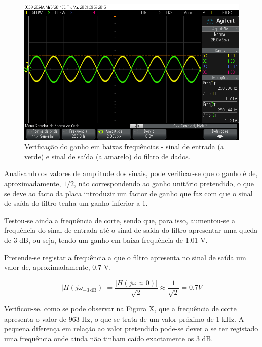 \documentclass[11pt]{article}
\numberwithin{equation}{section}
\begin{document}
\begin{figure}[H]
	\centering
	\includegraphics[keepaspectratio=true, scale=0.37]{exps/filtro_1k_baixafreq}
	\caption{Verificação do ganho em baixas frequências - sinal de entrada (a verde) e sinal de saída (a amarelo) do filtro de dados.}
	\vspace{-0.8em}
\end{figure} 

Analisando os valores de amplitude dos sinais, pode verificar-se que o ganho é de, aproximadamente, $1/2$, não correspondendo ao ganho unitário pretendido, o que se deve ao facto da placa introduzir um factor de ganho que faz com que o sinal de saída do filtro tenha um ganho inferior a 1. 

Testou-se ainda a frequência de corte, sendo que, para isso, aumentou-se a frequência do sinal de entrada até o sinal de saída do filtro apresentar uma queda de 3 dB, ou seja, tendo um ganho em baixa frequência de 1.01 V. 

Pretende-se registar a frequência a que o filtro apresenta no sinal de saída um valor de, aproximadamente, 0.7 V.

\vspace{-3mm}
\begin{equation}
	|H(j\omega_{-3~\text{dB}})| = \frac{|H(j\omega \approx 0)|}{\sqrt{2}} \approx \frac{1}{\sqrt{2}} = 0.7 V
\end{equation} 

\vspace{1mm}
Verificou-se, como se pode observar na Figura X, que a frequência de corte apresenta o valor de 963 Hz, o que se trata de um valor próximo de 1 kHz. A pequena diferença em relação ao valor pretendido pode-se dever a se ter registado uma frequência onde ainda não tinham caído exactamente os 3 dB.
\end{document}
